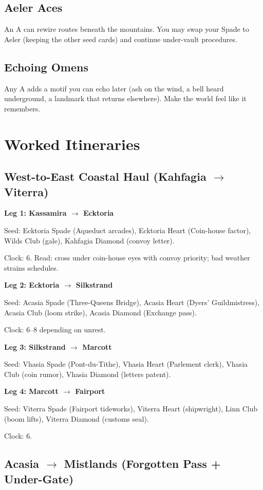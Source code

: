 \documentclass[11pt,letterpaper,twoside]{book}
\begin{document}
\subsection{Aeler Aces}
An A can rewire routes beneath the mountains. You may swap your Spade to Aeler (keeping the other seed cards) and continue under-vault procedures.

\subsection{Echoing Omens}
Any A adds a motif you can echo later (ash on the wind, a bell heard underground, a landmark that returns elsewhere). Make the world feel like it remembers.

\section{Worked Itineraries}

\subsection{West-to-East Coastal Haul (Kahfagia $\rightarrow$ Viterra)}

\textbf{Leg 1: Kassamira $\rightarrow$ Ecktoria}

Seed: Ecktoria Spade (Aqueduct arcades), Ecktoria Heart (Coin-house factor), Wilds Club (gale), Kahfagia Diamond (convoy letter).

Clock: 6. Read: cross under coin-house eyes with convoy priority; bad weather strains schedules.

\textbf{Leg 2: Ecktoria $\rightarrow$ Silkstrand}

Seed: Acasia Spade (Three-Queens Bridge), Acasia Heart (Dyers' Guildmistress), Acasia Club (loom strike), Acasia Diamond (Exchange pass).

Clock: 6--8 depending on unrest.

\textbf{Leg 3: Silkstrand $\rightarrow$ Marcott}

Seed: Vhasia Spade (Pont-du-Tithe), Vhasia Heart (Parlement clerk), Vhasia Club (coin rumor), Vhasia Diamond (letters patent).

\textbf{Leg 4: Marcott $\rightarrow$ Fairport}

Seed: Viterra Spade (Fairport tideworks), Viterra Heart (shipwright), Linn Club (boom lifts), Viterra Diamond (customs seal).

Clock: 6.

\subsection{Acasia $\rightarrow$ Mistlands (Forgotten Pass + Under-Gate)}
\end{document}
